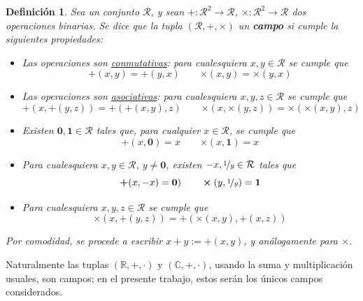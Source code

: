 \documentclass[12pt,letterpaper]{book}
\newtheorem{definicion}{Definición}[chapter]
\newcommand{\R}{\mathbb{R}}
\newcommand{\C}{\mathbb{C}}
\begin{document}
\begin{definicion}
Sea un conjunto $\mathcal{R}$, y sean $\boldsymbol{+} : \mathcal{R}^{2} \rightarrow \mathcal{R}$, $\boldsymbol{\times} : \mathcal{R}^{2} \rightarrow \mathcal{R}$ dos operaciones binarias. 
%
Se dice que la tupla $(\mathcal{R},\boldsymbol{+},\boldsymbol{\times})$ un \textbf{campo} si cumple la siguientes propiedades:
\begin{itemize}
\item Las operaciones son \ul{conmutativas}: para cualesquiera $x, y \in \mathcal{R}$ se cumple que 
\begin{equation*}
\boldsymbol{+}(x,y) = \boldsymbol{+}(y,x) \qquad \boldsymbol{\times}(x,y) = \boldsymbol{\times}(y,x)
\end{equation*}
\item Las operaciones son \ul{asociativas}: para cualesquiera $x, y, z \in \mathcal{R}$ se cumple que 
\begin{equation*}
\boldsymbol{+}(x,\boldsymbol{+}(y,z)) = \boldsymbol{+}(\boldsymbol{+}(x,y),z) \qquad \boldsymbol{\times}(x,\boldsymbol{\times}(y,z)) = \boldsymbol{\times}(\boldsymbol{\times}(x,y),z)
\end{equation*}
\item Existen $\boldsymbol{0}, \boldsymbol{1} \in \mathcal{R}$ tales que, para cualquier $x \in \mathcal{R}$, se cumple que
\begin{equation*}
\boldsymbol{+}(x,\boldsymbol{0}) = x \qquad \boldsymbol{\times}(x,\boldsymbol{1}) = x
\end{equation*}
\item Para cualesquiera $x, y \in \mathcal{R}$, $y \neq \boldsymbol{0}$, existen $-x, \nicefrac{1}{y} \in \mathcal{R}$ tales que
\begin{equation*}
\boldsymbol{+}(x,-x)=\boldsymbol{0}) \qquad \boldsymbol{\times}(y,\nicefrac{1}{y}) = \boldsymbol{1}
\end{equation*}
\item Para cualesquiera $x, y, z \in \mathcal{R}$ se cumple que 
\begin{equation*}
\boldsymbol{\times}(x, \boldsymbol{+}(y,z)) = \boldsymbol{+}( \boldsymbol{\times}(x,y), \boldsymbol{+}(x,z) )
\end{equation*}
\end{itemize}
Por comodidad, se procede a escribir $x+y := \boldsymbol{+}(x,y)$, y análogamente para $\boldsymbol{\times}$.
\end{definicion}

Naturalmente las tuplas $(\R,+,\cdot)$ y $(\C,+,\cdot)$, usando la suma y multiplicación usuales, son campos; en el presente trabajo, estos serán los únicos campos considerados.
\end{document}
